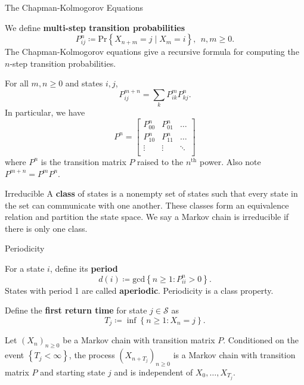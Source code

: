 \begin{idea}{The Chapman-Kolmogorov Equations}{}

    We define \textbf{multi-step transition probabilities}
    \[
        P_{ij}^n \coloneqq \mathrm{Pr} \left\{ X_{n + m} = j \mid X_{m} = i  \right\} , \ \ n,m\geq 0. 
    \]
    The Chapman-Kolmogorov equations give a recursive formula for computing the \( n \)-step transition probabilities. 

    For all \( m,n \geq 0  \) and states \( i,j \), 
    \[
        P_{ij}^{m+ n} = \sum_{k} P_{ik} ^m P_{kj}^n .    
    \]
    In particular,  we have
    \[
        P ^n= \begin{bmatrix}
            P_{00} ^n & P_{01}  ^n& \dots   \\
             P_{10} ^n&  P_{11} ^n&   \dots \\
             \vdots& \vdots & \ddots  \\ 
        \end{bmatrix}
    \] where \( P^n \) is the transition matrix \( P \) raised to the \( n^\text{th}  \) power. Also note \( P^{m+ n} = P^m P^n  \). 
\end{idea}

\begin{defn}{Irreducible}{}
A \textbf{class} of states is a nonempty set of states such that every state in the set can communicate with one another. These classes form an equivalence relation and partition the state space. We say a Markov chain is irreducible if there is only one class. 


\end{defn}

\begin{defn}{Periodicity}{}

    For a state \( i \), define its \textbf{period}
    \[
        d(i) \coloneqq \mathrm{gcd} \left\{ n\geq 1: P_{i i} ^n  > 0\right\} .
    \]
    States with period 1 are called \textbf{aperiodic}. 
    Periodicity is a class property. 
\end{defn}

\begin{idea}{}{}
Define the \textbf{first return time} for state \( j \in \mathcal{S}  \) as 
\[
    T_{j} \coloneqq \inf \left\{ n\geq 1: X_{n} = j \right\}. 
\]

Let \( (X_{n} ) _{n\geq 0} \) be a Markov chain with transition matrix \( P \). Conditioned on the event \( \left\{ T_{j} < \infty  \right\}  \), the process \( (X_{n + T_{j} })_{n\geq 0} \) is a Markov chain with transition matrix \( P \) and starting state \( j \) and is independent of \( X _0, \dots , X_{T_j} \). 
\end{idea}

